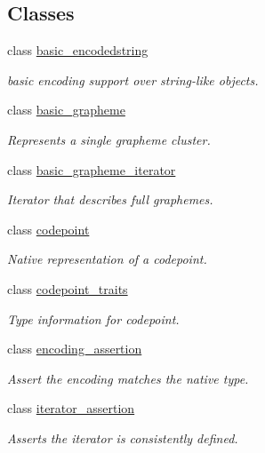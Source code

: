 \subsection*{Classes}
\begin{DoxyCompactItemize}
\item 
class \hyperlink{classu5e_1_1basic__encodedstring}{basic\+\_\+encodedstring}
\begin{DoxyCompactList}\small\item\em basic encoding support over string-\/like objects. \end{DoxyCompactList}\item 
class \hyperlink{classu5e_1_1basic__grapheme}{basic\+\_\+grapheme}
\begin{DoxyCompactList}\small\item\em Represents a single grapheme cluster. \end{DoxyCompactList}\item 
class \hyperlink{classu5e_1_1basic__grapheme__iterator}{basic\+\_\+grapheme\+\_\+iterator}
\begin{DoxyCompactList}\small\item\em Iterator that describes full graphemes. \end{DoxyCompactList}\item 
class \hyperlink{classu5e_1_1codepoint}{codepoint}
\begin{DoxyCompactList}\small\item\em Native representation of a codepoint. \end{DoxyCompactList}\item 
class \hyperlink{classu5e_1_1codepoint__traits}{codepoint\+\_\+traits}
\begin{DoxyCompactList}\small\item\em Type information for codepoint. \end{DoxyCompactList}\item 
class \hyperlink{classu5e_1_1encoding__assertion}{encoding\+\_\+assertion}
\begin{DoxyCompactList}\small\item\em Assert the encoding matches the native type. \end{DoxyCompactList}\item 
class \hyperlink{classu5e_1_1iterator__assertion}{iterator\+\_\+assertion}
\begin{DoxyCompactList}\small\item\em Asserts the iterator is consistently defined. \end{DoxyCompactList}\item 

\end{DoxyCompactItemize}
